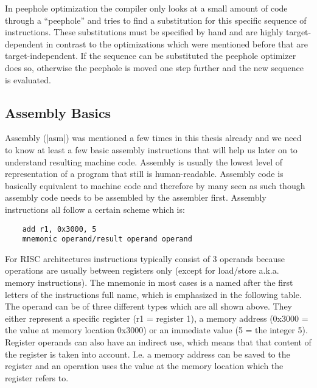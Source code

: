 In peephole optimization the compiler only looks at a small amount of code through a ``peephole'' and tries to find a substitution for this specific sequence of instructions.
These substitutions must be specified by hand and are highly target-dependent in contrast to the optimizations which were mentioned before that are target-independent.
If the sequence can be substituted the peephole optimizer does so, otherwise the peephole is moved one step further and the new sequence is evaluated.

\subsection{Assembly Basics}
Assembly (|asm|) was mentioned a few times in this thesis already and we need to know at least a few basic assembly instructions that will help us later on to understand resulting machine code.
Assembly is usually the lowest level of representation of a program that still is human-readable.
Assembly code is basically equivalent to machine code and therefore by many seen as such though assembly code needs to be assembled by the assembler first.
Assembly instructions all follow a certain scheme which is:
\begin{lstlisting}
    add r1, 0x3000, 5
    mnemonic operand/result operand operand
\end{lstlisting}
For RISC architectures instructions typically consist of 3 operands because operations are usually between registers only (except for load/store a.k.a. memory instructions).
The mnemonic in most cases is a named after the first letters of the instructions full name, which is emphasized in the following table.
The operand can be of three different types which are all shown above.
They either represent a specific register (r1 = register 1), a memory address (0x3000 = the value at memory location 0x3000) or an immediate value (5 = the integer 5).
Register operands can also have an indirect use, which means that that content of the register is taken into account.
I.e. a memory address can be saved to the register and an operation uses the value at the memory location which the register refers to.

